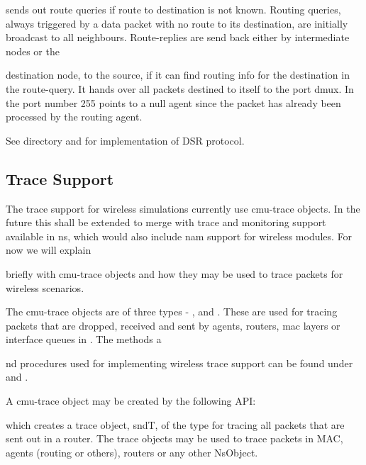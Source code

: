  sends out route queries if route to destination is not known. Routing queries, always triggered by a data packet with no route to its destination, are initially broadcast to all neighbours. Route-replies are send back either by intermediate nodes or the 









destination node, to the source, if it can find routing info for the destination in the route-query.  It hands over all packets destined to itself to the port dmux.
In  the port number 255 points to a null agent since the packet has already been processed by the routing agent.

See  directory and  for implementation of DSR protocol.


\subsection{Trace Support}
\label{sec:mobile-trace}

The trace support for wireless simulations currently use cmu-trace objects. In the future this shall be extended to merge with trace and monitoring support available in ns, which would also include nam support for wireless modules. For now we will explain









 briefly with cmu-trace objects and how they may be used to trace packets for wireless scenarios. 

The cmu-trace objects are of three types - ,  and . These are used for tracing packets that are dropped, received and sent by agents, routers, mac layers or interface queues in \ns. The methods a









nd procedures used for implementing wireless trace support can be found under  and .

A cmu-trace object may be created by the following API:

which creates a trace object, sndT, of the type  for tracing all packets that are sent out in a router. The trace objects may be used to trace packets in MAC, agents (routing or others), routers or any other NsObject. 

